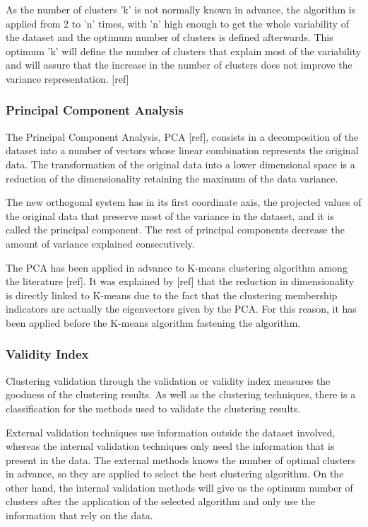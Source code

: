 As the number of clusters 'k' is not normally known in advance, the algorithm is applied from 2 to 'n' times, with 'n' high enough to get the whole variability of the dataset and the optimum number of clusters is defined afterwards. This optimum 'k' will define the number of clusters that explain most of the variability and will assure that the increase in the number of clusters does not improve the variance representation. [ref]

\subsubsection{Principal Component Analysis}

The Principal Component Analysis, PCA [ref], consists in a decomposition of the dataset into a number of vectors whose linear combination represents the original data. The transformation of the original data into a lower dimensional space is a reduction of the dimensionality retaining the maximum of the data variance.

The new orthogonal system has in its first coordinate axis, the projected values of the original data that preserve most of the variance in the dataset, and it is called the principal component. The rest of principal components decrease the amount of variance explained consecutively.

The PCA has been applied in advance to K-means clustering algorithm among the literature [ref]. It was explained by [ref] that the reduction in dimensionality is directly linked to K-means due to the fact that the clustering membership indicators are actually the eigenvectors given by the PCA. For this reason, it has been applied before the K-means algorithm fastening the algorithm.

\subsubsection{Validity Index}

Clustering validation through the validation or validity index measures the goodness of the clustering results. As well as the clustering techniques, there is a classification for the methods used to validate the clustering results.

External validation techniques use information outside the dataset involved, whereas the internal validation techniques only need the information that is present in the data. The external methods knows the number of optimal clusters in advance, so they are applied to select the best clustering algorithm. On the other hand, the internal validation methods will give us the optimum number of clusters after the application of the selected algorithm and only use the information that rely on the data.

